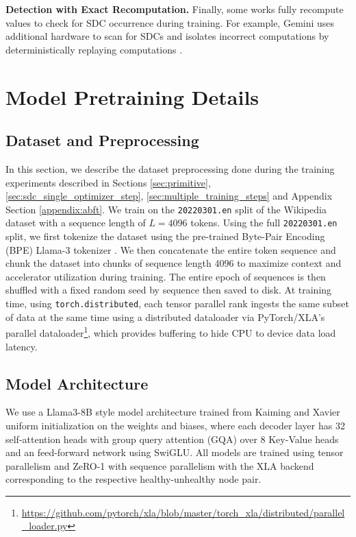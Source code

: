 \textbf{Detection with Exact Recomputation.} Finally, some works fully recompute values to check for SDC occurrence during training. For example, Gemini uses additional hardware to scan for SDCs and isolates incorrect computations by deterministically replaying computations \cite {geminiteam2024geminifamilyhighlycapable}.

\section{Model Pretraining Details} \label{appendix:model_training}
\subsection{Dataset and Preprocessing}


In this section, we describe the dataset preprocessing done during the training experiments described in Sections \ref{sec:primitive}, \ref{sec:sdc_single_optimizer_step}, \ref{sec:multiple_training_steps} and Appendix Section \ref{appendix:abft}. We train on the \verb|20220301.en| split of the Wikipedia dataset \cite{wikidump} with a sequence length of $L=4096$ tokens. Using the full \verb|20220301.en| split, we first tokenize the dataset using the pre-trained Byte-Pair Encoding (BPE) Llama-3 tokenizer \cite{dubey2024llama3herdmodels} . We then concatenate the entire token sequence and chunk the dataset into chunks of sequence length 4096 to maximize context and accelerator utilization during training. The entire epoch of sequences is then shuffled with a fixed random seed by sequence then saved to disk. At training time, using \verb|torch.distributed|, each tensor parallel rank ingests the same subset of data at the same time using a distributed dataloader via PyTorch/XLA's parallel dataloader\footnote{\url{https://github.com/pytorch/xla/blob/master/torch_xla/distributed/parallel_loader.py}}, which provides buffering to hide CPU to device data load latency.

\subsection{Model Architecture}

We use a Llama3-8B style model architecture \cite{dubey2024llama3herdmodels} trained from Kaiming and Xavier uniform initialization on the weights and biases, where each decoder layer has 32 self-attention heads with group query attention (GQA) over 8 Key-Value heads and an feed-forward network using SwiGLU. All models are trained using tensor parallelism and ZeRO-1 with sequence parallelism \cite{rajbhandari2020zeromemoryoptimizationstraining, korthikanti2022reducingactivationrecomputationlarge} with the XLA backend corresponding to the respective healthy-unhealthy node pair.

